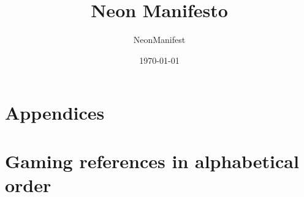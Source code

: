 \documentclass{article}
\title{Neon Manifesto}
\author{NeonManifest}
\date{\today}
\begin{document}
\maketitle

\tableofcontents









\appendix
\section*{Appendices}
\section{Gaming references in alphabetical order}
\end{document}
